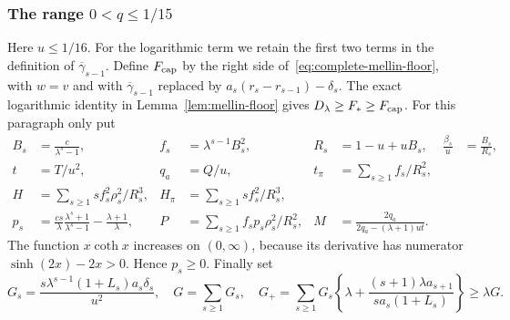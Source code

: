 \subsubsection{The range \texorpdfstring{$0<q\le1/15$}{0 < q <= 1/15}}
Here $u\le1/16$. For the logarithmic term we retain the first two
terms in the definition of $\overline\gamma_{s-1}$. Define
$F_{\rm cap}$ by the right side of~\eqref{eq:complete-mellin-floor},
with $w=v$ and with $\overline\gamma_{s-1}$ replaced by
$a_s(r_s-r_{s-1})-\delta_s$.
The exact logarithmic identity in Lemma~\ref{lem:mellin-floor} gives
$D_\lambda\ge F_*\ge F_{\rm cap}$.
For this paragraph only put
\begin{align*}
 B_s&=\frac{c}{\lambda^s-1},& f_s&=\lambda^{s-1}B_s^2,&
 R_s&=1-u+uB_s,& \frac{\beta_s}{u}&=\frac{B_s}{R_s},\\
 t&=T/u^2,&q_a&=Q/u,&t_\pi&=\sum_{s\ge1}f_s/R_s^2,\\
 H&=\sum_{s\ge1}s f_s^2\rho_s^2/R_s^3,&
 H_\pi&=\sum_{s\ge1}s f_s^2/R_s^3,\\
 p_s&=\frac{cs}{\lambda}\frac{\lambda^s+1}{\lambda^s-1}
                 -\frac{\lambda+1}\lambda,&
 P&=\sum_{s\ge1}f_sp_s\rho_s^2/R_s^2,&
 M&=\frac{2q_a}{2q_a-(\lambda+1)ut}.
\end{align*}
The function $x\coth x$ increases on $(0,\infty)$, because its
derivative has numerator $\sinh(2x)-2x>0$.  Hence $p_s\ge0$.
Finally set
\[
 G_s=\frac{s\lambda^{s-1}(1+L_s)a_s\delta_s}{u^2},\quad
 G=\sum_{s\ge1}G_s,\quad
 G_+=\sum_{s\ge1}G_s\left\{\lambda+
 \frac{(s+1)\lambda a_{s+1}}{s a_s(1+L_s)}\right\}\ge\lambda G.
\]

